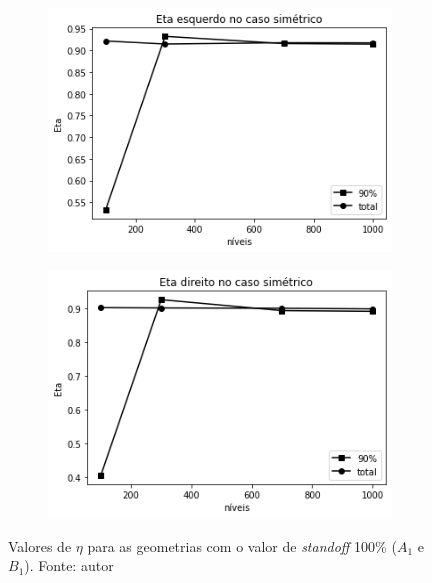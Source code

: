    \begin{figure}[H]
        \centering
        \begin{subfigure}[b]{0.42\linewidth}
    		\includegraphics[width=\linewidth]{img/eta/eta_esquerdo_simetrico.png}
    	\end{subfigure}
    	\begin{subfigure}[b]{0.42\linewidth}
    		\includegraphics[width=\linewidth]{img/eta/eta_direito_simetrico.png}
    	\end{subfigure}
    	\caption{Valores de $\eta$ para as geometrias com o valor de \textit{standoff} 100\% ($A_1$ e $B_1$). Fonte: autor}
    	\label{fig:eta_simetrico}
    \end{figure}
    
